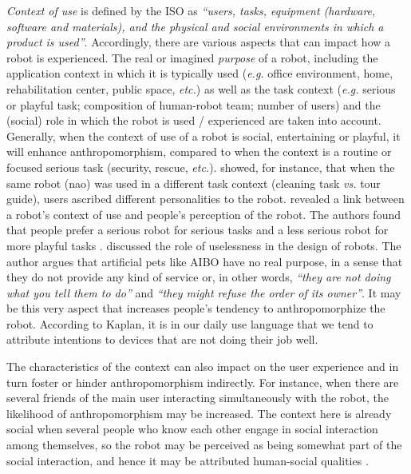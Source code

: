 \documentclass{frontiersSCNS} %
\newcommand{\eg}{\textit{e.g.}\xspace}
\newcommand{\etc}{\textit{etc.}\xspace}
\newcommand{\vs}{\textit{vs.}\xspace}
\begin{document}
\textit{Context of use} is defined by the ISO as \textit{``users, tasks,
equipment (hardware, software and materials), and the physical and social
environments in which a product is used''}. Accordingly, there are various
aspects that can impact how a robot is experienced. The real or imagined
\textit{purpose} of a robot, including the application context in which it is
typically used (\eg office environment, home, rehabilitation center, public
space, \etc) as well as the task context (\eg serious or playful task;
composition of human-robot team; number of users) and the (social) role in which
the robot is used / experienced are taken into account. Generally, when the
context of use of a robot is social, entertaining or playful, it will enhance
anthropomorphism, compared to when the context is a routine or focused serious
task (security, rescue, \etc). \cite{joosse_what_2013} showed, for instance,
that when the same robot ({\sc nao}) was used in a different task context (cleaning
task \vs tour guide), users ascribed different personalities to the robot. \cite{goetz_cooperation_2002}
revealed a link between a robot's context of use and people's perception of the
robot. The authors found that people prefer a serious robot for serious tasks
and a less serious robot for more playful tasks
. \cite{kaplan_free_2000}
discussed the role of uselessness in the design of robots. The author argues
that artificial pets like AIBO have no real purpose, in a sense that they do not
provide any kind of service or, in other words, \textit{``they are not doing
what you tell them to do''} and \textit{``they might refuse the order of its
owner''}. It may be this very aspect that increases people's tendency to
anthropomorphize the robot. According to Kaplan, it is in our daily use language
that we tend to attribute intentions to devices that are not doing their job
well.

The characteristics of the context can also impact on the user experience and in
turn foster or hinder anthropomorphism indirectly. For instance, when there are
several friends of the main user interacting simultaneously with the robot, the
likelihood of anthropomorphism may be increased. The context here is already
social when several people who know each other engage in social interaction
among themselves, so the robot may be perceived as being somewhat part of the
social interaction, and hence it may be attributed human-social qualities
\citep{baxter2013do}.



%
%
%
%
%
%
\end{document}
